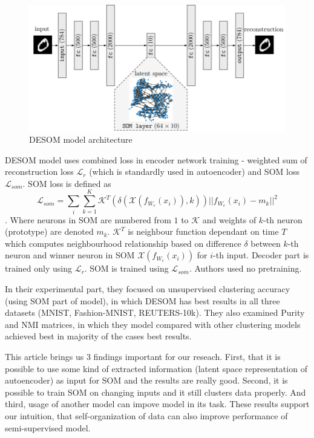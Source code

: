 \begin{figure}[h!]
        \centering
        \includegraphics[width=1\textwidth]{figs/DESOM-architecture-with-an-8-8-map.png}
        \caption{DESOM model architecture \cite{desom2019}}
        \label{fig:desom}
\end{figure}

DESOM model uses combined loss in encoder network training - weighted sum of reconstruction loss $\mathcal{L}_r$ (which is standardly used in autoencoder) and SOM loss $\mathcal{L}_{som}$.
SOM loss is defined as $$\mathcal{L}_{som} = \sum_i \sum_{k=1}^K \mathcal{K}^T (\delta (\mathcal{X}(f_{W_e}(x_i)), k)) {||f_{W_e}(x_i) - m_k||}^2$$. Where neurons in SOM are numbered from $1$ to $\mathcal{K}$ and weights of $k$-th neuron (prototype) are denoted $m_k$. $\mathcal{K}^T$ is neighbour function dependant on time $T$ which computes neighbourhood relationship based on difference $\delta$ between $k$-th neuron and winner neuron in SOM $\mathcal{X}(f_{W_e}(x_i))$ for $i$-th input.
Decoder part is trained only using $\mathcal{L}_r$. SOM is trained using $\mathcal{L}_{som}$. Authors used no pretraining.

In their experimental part, they focused on unsupervised clustering accuracy (using SOM part of model), in which DESOM has best results in all three datasets (MNIST, Fashion-MNIST, REUTERS-10k). They also examined Purity and NMI matrices, in which they model compared with other clustering models achieved best in majority of the cases best results.

This article brings us $3$ findings important for our reseach. First, that it is possible to use some kind of extracted information (latent space representation of autoencoder) as input for SOM and the results are really good. Second, it is possible to train SOM on changing inputs and it still clusters data properly. And third, usage of another model can impove model in its task. These results support our intuition, that self-organization of data can also improve performance of semi-supervised model.


